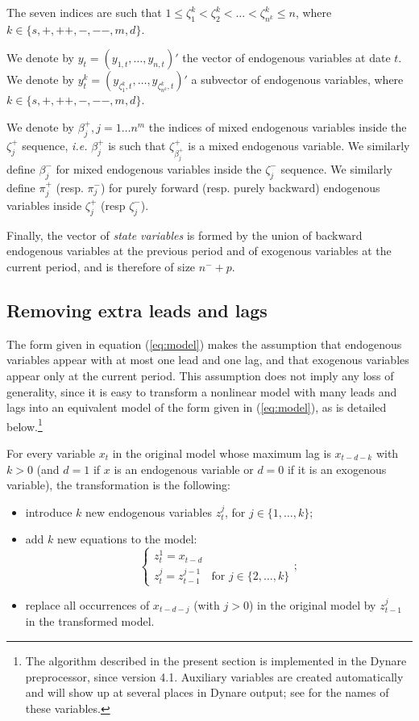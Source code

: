 \documentclass[11pt,a4paper]{article}
\begin{document}
The seven indices are such that $1 \leq \zeta^k_1 < \zeta^k_2 < \ldots <
\zeta^k_{n^k} \leq n$, where $k \in \{ s, +, ++, -, --, m, d \}$.

We denote by $y_t = (y_{1,t}, \ldots, y_{n,t})'$ the vector of endogenous
variables at date $t$. We denote by $y^k_t = (y_{\zeta^k_1, t}, \ldots,
y_{\zeta^k_{n^k}, t})'$ a subvector of endogenous variables, where $k \in \{
s, +, ++, -, --, m, d \}$.

We denote by $\beta^+_j, j=1\ldots n^m$ the indices of mixed endogenous
variables inside the $\zeta^+_j$ sequence, \textit{i.e.} $\beta^+_j$ is such
that $\zeta^+_{\beta^+_j}$ is a mixed endogenous variable. We similarly define
$\beta^-_j$ for mixed endogenous variables inside the $\zeta^-_j$ sequence. We
similarly define $\pi^+_j$ (resp. $\pi^-_j$) for purely forward (resp. purely
backward) endogenous variables inside $\zeta^+_j$ (resp $\zeta^-_j$).

Finally, the vector of \emph{state variables} is formed by the union of
backward endogenous variables at the previous period and of exogenous variables
at the current period, and is therefore of size $n^-+p$.

\subsection{Removing extra leads and lags}

The form given in equation (\ref{eq:model}) makes the assumption that
endogenous variables appear with at most one lead and one lag, and
that exogenous variables appear only at the current period. This
assumption does not imply any loss of generality, since it is easy to
transform a nonlinear model with many leads and lags into an
equivalent model of the form given in (\ref{eq:model}), as is detailed
below.\footnote{The algorithm described in the present section is
  implemented in the Dynare preprocessor, since version 4.1. Auxiliary
  variables are created automatically and will show up at several
  places in Dynare output; see \citet{adjemian/al:2011} for the names
  of these variables.}

For every variable $x_t$ in the original model whose maximum lag is $x_{t-d-k}$
with $k>0$ (and $d=1$ if $x$ is an endogenous variable or $d=0$ if it is an
exogenous variable), the transformation is the following:
\begin{itemize}
\item introduce $k$ new endogenous variables $z^j_t$, for
  $j\in\{1,\ldots,k\}$;
\item add $k$ new equations to the model:
  \begin{equation*}
    \left\{\begin{array}{ll}
        z^1_t = x_{t-d} & \\
        z^j_t = z^{j-1}_{t-1} & \text{for } j\in\{2, \ldots,k\}
      \end{array}\right.;
  \end{equation*}
\item replace all occurrences of $x_{t-d-j}$ (with $j>0$) in the original model
  by $z^j_{t-1}$ in the transformed model.
\end{itemize}
\end{document}
